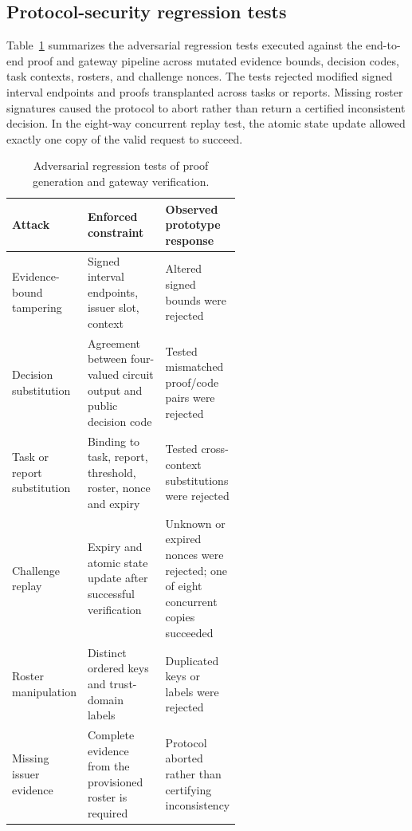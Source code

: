 \subsection{Protocol-security regression tests}
Table~\ref{tab:security-validation} summarizes the adversarial regression tests executed against the end-to-end proof and gateway pipeline across mutated evidence bounds, decision codes, task contexts, rosters, and challenge nonces. The tests rejected modified signed interval endpoints and proofs transplanted across tasks or reports. Missing roster signatures caused the protocol to abort rather than return a certified inconsistent decision. In the eight-way concurrent replay test, the atomic state update allowed exactly one copy of the valid request to succeed.

\begin{table}[htbp]\centering\small
\caption{Adversarial regression tests of proof generation and gateway verification.}\label{tab:security-validation}
\begin{tabularx}{\linewidth}{@{}p{0.22\linewidth}p{0.35\linewidth}X@{}}\toprule
Attack & Enforced constraint & Observed prototype response\\\midrule
Evidence-bound tampering & Signed interval endpoints, issuer slot, context & Altered signed bounds were rejected\\
Decision substitution & Agreement between four-valued circuit output and public decision code & Tested mismatched proof/code pairs were rejected\\
Task or report substitution & Binding to task, report, threshold, roster, nonce and expiry & Tested cross-context substitutions were rejected\\
Challenge replay & Expiry and atomic state update after successful verification & Unknown or expired nonces were rejected; one of eight concurrent copies succeeded\\
Roster manipulation & Distinct ordered keys and trust-domain labels & Duplicated keys or labels were rejected\\
Missing issuer evidence & Complete evidence from the provisioned roster is required & Protocol aborted rather than certifying inconsistency\\\bottomrule
\end{tabularx}\end{table}